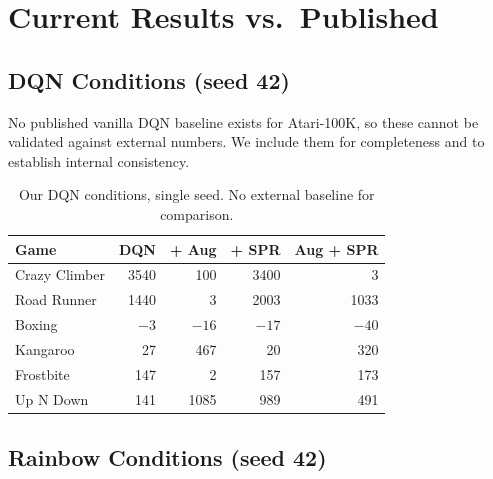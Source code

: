 \documentclass[11pt]{article}
\begin{document}
\section{Current Results vs.\ Published}

\subsection{DQN Conditions (seed 42)}

No published vanilla DQN baseline exists for Atari-100K, so these
cannot be validated against external numbers. We include them for
completeness and to establish internal consistency.

\begin{table}[H]
\centering
\small
\renewcommand{\arraystretch}{1.5}
\setlength{\tabcolsep}{6pt}
\begin{tabular}{l rrrr}
\toprule
\textbf{Game} & \textbf{DQN} & \textbf{+ Aug} & \textbf{+ SPR}
  & \textbf{Aug + SPR} \\
\midrule
Crazy Climber & 3540  & 100   & 3400  & 3     \\
Road Runner   & 1440  & 3     & 2003  & 1033  \\
Boxing        & $-3$  & $-16$ & $-17$ & $-40$ \\
Kangaroo      & 27    & 467   & 20    & 320   \\
Frostbite     & 147   & 2     & 157   & 173   \\
Up N Down     & 141   & 1085  & 989   & 491   \\
\bottomrule
\end{tabular}
\caption{Our DQN conditions, single seed. No external baseline
for comparison.}
\end{table}

\subsection{Rainbow Conditions (seed 42)}
\end{document}
